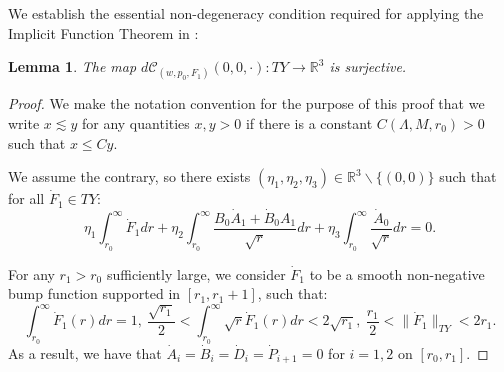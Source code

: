 \documentclass[11pt]{article}
\newtheorem{lemma}{Lemma}[section]
\numberwithin{equation}{section}
\begin{document}
We establish the essential non-degeneracy condition required for applying the Implicit Function Theorem in :
\begin{lemma}\label{dC is surjective lemma}
    The map $d\mathcal{C}_{(w,p_0,F_1)}(0,0,\cdot):TY\rightarrow\mathbb{R}^3$ is surjective.
\end{lemma}
\begin{proof}
    We make the notation convention for the purpose of this proof that we write $x\lesssim y$ for any quantities $x,y>0$ if there is a constant $C(\Lambda,M,r_0)>0$ such that $x\leq Cy.$
    
    We assume the contrary, so there exists $(\eta_1,\eta_2,\eta_3)\in\mathbb{R}^3\backslash\{(0,0)\}$ such that for all $\dot{F}_1\in TY$:
    \begin{equation}\label{linear dep eq}
        \eta_1\int_{r_0}^{\infty}\dot{F}_1dr+\eta_2\int_{r_0}^{\infty}\frac{B_0\dot{A}_1+\dot{B}_0A_1}{\sqrt{r}}dr+\eta_3\int_{r_0}^{\infty}\frac{\dot{A}_0}{\sqrt{r}}dr=0.
    \end{equation}
    
    
    For any $r_1>r_0$ sufficiently large, we consider $\dot{F}_1$ to be a smooth non-negative bump function supported in $[r_1,r_1+1]$, such that:
    \begin{equation}\label{conditions on F1 dot}
        \int_{r_0}^{\infty}\dot{F}_1(r)dr=1,\ \frac{\sqrt{r_1}}{2}<\int_{r_0}^{\infty}\sqrt{r}\dot{F}_1(r)dr<2\sqrt{r_1},\ \frac{r_1}{2}<\|\dot{F}_1\|_{TY}<2r_1.
    \end{equation}
    As a result, we have that $\dot{A}_i=\dot{B}_i=\dot{D}_i=\dot{P}_{i+1}=0$ for $i=1,2$ on $[r_0,r_1].$ 


\end{proof}
\end{document}

